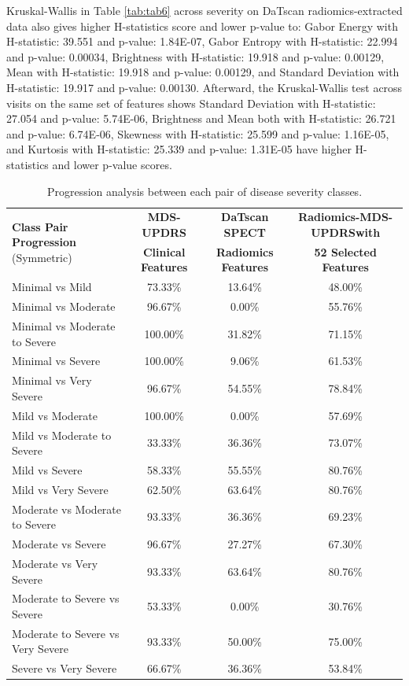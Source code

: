 \documentclass{article}
\begin{document}
Kruskal-Wallis in Table \ref{tab:tab6} across severity on DaTscan radiomics-extracted data also gives higher H-statistics score and lower p-value to: Gabor Energy with H-statistic: 39.551 and p-value: 1.84E-07, Gabor Entropy with H-statistic: 22.994 and p-value: 0.00034, Brightness with H-statistic: 19.918 and p-value: 0.00129, Mean with H-statistic: 19.918 and p-value: 0.00129, and Standard Deviation with H-statistic: 19.917 and p-value: 0.00130. Afterward, the Kruskal-Wallis test across visits on the same set of features shows Standard Deviation with H-statistic: 27.054 and p-value: 5.74E-06, Brightness and Mean both with H-statistic: 26.721 and p-value: 6.74E-06, Skewness with H-statistic: 25.599 and p-value: 1.16E-05, and Kurtosis with H-statistic: 25.339 and p-value: 1.31E-05 have higher H-statistics and lower p-value scores.
\begin{table}[ht!]
    \centering
    \caption{Progression analysis between each pair of disease severity classes.}
    \label{tab:tab8}
    \renewcommand{\arraystretch}{1.5}
    \begin{tabular}{lccc}
        \hline
        \multirow{2}{*}{\textbf{Class Pair Progression} \scriptsize{(Symmetric)}} & \multicolumn{1}{c}{\textbf{MDS-UPDRS}} & \multicolumn{1}{c}{\textbf{DaTscan SPECT}} & \multicolumn{1}{c}{\textbf{Radiomics-MDS-UPDRSwith}} \\ 
        & \multicolumn{1}{c}{\textbf{Clinical Features}} & \multicolumn{1}{c}{\textbf{Radiomics Features}} & \multicolumn{1}{c}{\textbf{52 Selected Features}} \\ \hline
        Minimal vs Mild & 73.33\% & 13.64\% & 48.00\% \\ 
        Minimal vs Moderate & 96.67\% & 0.00\% & 55.76\% \\ 
        Minimal vs Moderate to Severe & 100.00\% & 31.82\% & 71.15\% \\ 
        Minimal vs Severe & 100.00\% & 9.06\% & 61.53\% \\ 
        Minimal vs Very Severe & 96.67\% & 54.55\% & 78.84\% \\ 
        Mild vs Moderate & 100.00\% & 0.00\% & 57.69\% \\ 
        Mild vs Moderate to Severe & 33.33\% & 36.36\% & 73.07\% \\ 
        Mild vs Severe & 58.33\% & 55.55\% & 80.76\% \\ 
        Mild vs Very Severe & 62.50\% & 63.64\% & 80.76\% \\ 
        Moderate vs Moderate to Severe & 93.33\% & 36.36\% & 69.23\% \\ 
        Moderate vs Severe & 96.67\% & 27.27\% & 67.30\% \\ 
        Moderate vs Very Severe & 93.33\% & 63.64\% & 80.76\% \\ 
        Moderate to Severe vs Severe & 53.33\% & 0.00\% & 30.76\% \\ 
        Moderate to Severe vs Very Severe & 93.33\% & 50.00\% & 75.00\% \\ 
        Severe vs Very Severe & 66.67\% & 36.36\% & 53.84\% \\ \hline
    \end{tabular}
\end{table}
\end{document}
